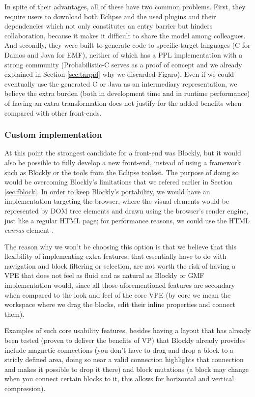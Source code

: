 In spite of their advantages, all of these have two common problems. First, they require
users to download both Eclipse and the used plugins and their dependencies
which not only constitutes an entry barrier but hinders collaboration, because
it makes it difficult to share the model among colleagues. And secondly, they
were built to generate code to specific target languages (C for Damos and Java
for EMF), neither of which has a PPL implementation with a strong community
(Probabilistic-C \cite{Paige2014} serves as a proof of concept and we already explained
in Section \ref{sec:tarppl} why we discarded Figaro). Even if we could eventually
use the generated C or Java as an intermediary representation, we believe the
extra burden (both in development time and in runtime performance) of having an
extra transformation does not justify for the added benefits when compared with
other front-ends.

\subsubsection{Custom implementation}

At this point the strongest candidate for a front-end was Blockly,
but it would also be possible to fully develop a new front-end, instead of using
a framework such as Blockly or the tools from the Eclipse toolset. The purpose of
doing so would be overcoming Blockly's limitations that we refered earlier in
Section \ref{sec:fblock}. In order to keep Blockly's portability, we would have an
implementation targeting the browser, where the visual elements would be
represented by DOM tree elements and drawn using the browser's render engine,
just like a regular HTML page; for performance reasons, we could use the HTML
\textit{canvas} element \cite{w3ccanvas}.

The reason why we won't be choosing this option is that we believe that this
flexibility of implementing extra features, that essentially have to do with
navigation and block filtering or selection, are not worth the risk of having
a VPE that does not feel as fluid and as natural as Blockly or GMF implementation would, since all
those aforementioned features are secondary when compared to the look and feel
of the core VPE (by core we mean the workspace where we drag the blocks, edit
their inline properties and connect them).

Examples of such core usability features, besides having a layout that has already been
tested (proven to deliver the benefits of VP)
that Blockly already provides include magnetic connections
(you don't have to drag and drop a block to a stricly defined area, doing so near
a valid connection highlights that connection and makes it possible to drop it there)
and block mutations (a block may change when you connect certain blocks to it,
this allows for horizontal and vertical compression).

